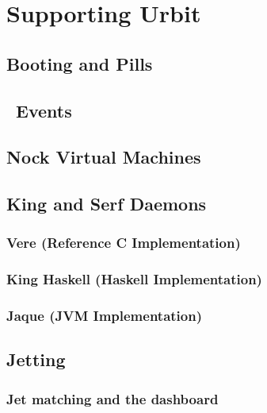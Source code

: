 \setchapterpreamble[u]{\margintoc}
\chapter{Supporting Urbit}


\section{Booting and Pills}

\section{\unix~Events}

\section{Nock Virtual Machines}

\subsection{\mock}

\section{King and Serf Daemons}

\subsection{Vere (Reference C Implementation)}

\subsection{King Haskell (Haskell Implementation)}

\subsection{Jaque (JVM Implementation)}

\section{Jetting}

\subsection{Jet matching and the dashboard}
